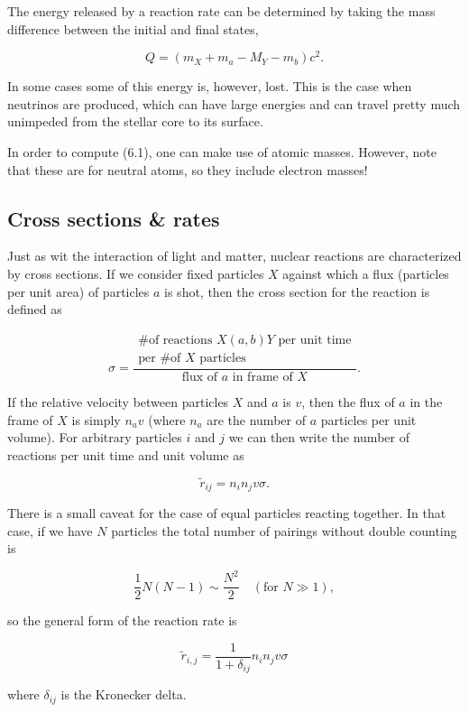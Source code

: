 \documentclass[twocolumn]{article}
\begin{document}
The energy released by a reaction rate can be determined by taking the
mass difference between the initial and final states,

\[Q=(m_X+m_a-M_Y-m_b)c^2.\tag{6.1}\]

In some cases some of this energy is, however, lost. This is the case
when neutrinos are produced, which can have large energies and can
travel pretty much unimpeded from the stellar core to its surface.

In order to compute (6.1), one can make use of atomic masses. However,
note that these are for neutral atoms, so they include electron masses!

\hypertarget{cross-sections-rates}{%
\subsection{Cross sections \& rates}\label{cross-sections-rates}}

Just as wit the interaction of light and matter, nuclear reactions are
characterized by cross sections. If we consider fixed particles \(X\)
against which a flux (particles per unit area) of particles \(a\) is
shot, then the cross section for the reaction is defined as

\[\sigma = \frac{\begin{matrix}\text{\# of reactions $X(a,b)Y$ per unit time} \\ \text{per \# of $X$ particles}\end{matrix}}{\text{flux of $a$ in frame of $X$}}.\]

If the relative velocity between particles \(X\) and \(a\) is \(v\),
then the flux of \(a\) in the frame of \(X\) is simply \(n_av\) (where
\(n_a\) are the number of \(a\) particles per unit volume). For
arbitrary particles \(i\) and \(j\) we can then write the number of
reactions per unit time and unit volume as

\[\tilde{r}_{ij}=n_i n_j v \sigma.\]

There is a small caveat for the case of equal particles reacting
together. In that case, if we have \(N\) particles the total number of
pairings without double counting is

\[\frac{1}{2}N(N-1)\sim \frac{N^2}{2}\quad(\text{for $N\gg 1$}),\]

so the general form of the reaction rate is

\[\tilde{r}_{i,j}=\frac{1}{1+\delta_{ij}}n_in_jv\sigma\]

where \(\delta_{ij}\) is the Kronecker delta.
\end{document}
